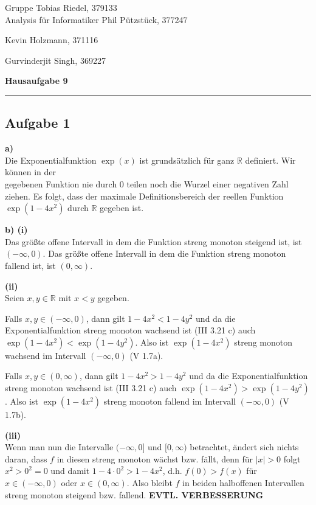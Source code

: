 \documentclass[a4paper,graphics,11pt]{article}
\newcommand{\aufgabe}[1]{\subsection*{Aufgabe #1}}
\begin{document}
\noindent Gruppe              \hfill Tobias Riedel, 379133 \\
\noindent Analysis für Informatiker             \hfill Phil Pützstück, 377247 \\
\strut\hfill Kevin Holzmann, 371116\\
\strut\hfill Gurvinderjit Singh, 369227
\begin{center}
	\LARGE{\textbf{Hausaufgabe 9}}
\end{center}
\begin{center}
\rule[0.1ex]{\textwidth}{1pt}
\end{center}



\aufgabe{1}
\textbf{a)}\\
Die Exponentialfunktion $\exp(x)$ ist grundsätzlich für ganz $\mathbb{R}$ definiert.
Wir können in der\\
gegebenen Funktion nie durch 0 teilen noch die Wurzel einer
negativen Zahl ziehen. Es folgt, dass der maximale Definitionsbereich der
reellen Funktion $\exp(1-4x^2)$ durch $\mathbb{R}$ gegeben ist.

\textbf{b) (i)}\\
Das größte offene Intervall in dem die Funktion streng monoton steigend ist, ist
$(-\infty, 0)$. Das größte offene Intervall in dem die Funktion streng monoton
fallend ist, ist $(0, \infty)$.

\textbf{(ii)}\\
Seien $x,y \in \mathbb{R}$ mit $x<y$ gegeben.

Falls $x,y \in (-\infty, 0)$, dann gilt $1-4x^2 < 1-4y^2$ und da die Exponentialfunktion
streng monoton wachsend ist (III 3.21 c) auch $\exp(1-4x^2) < \exp(1-4y^2)$.
Also ist $\exp(1-4x^2)$ streng monoton wachsend im Intervall $(-\infty, 0)$ (V 1.7a).

Falls $x,y \in (0, \infty)$, dann gilt $1-4x^2 > 1-4y^2$ und da die Exponentialfunktion
streng monoton wachsend ist (III 3.21 c) auch $\exp(1-4x^2) > \exp(1-4y^2)$.
Also ist $\exp(1-4x^2)$ streng monoton fallend im Intervall $(-\infty, 0)$ (V 1.7b).

\textbf{(iii)}\\
Wenn man nun die Intervalle $(-\infty, 0]$ und $[0, \infty)$ betrachtet, ändert sich
nichts daran, dass $f$ in diesen streng monoton wächst bzw. fällt, denn für
$|x| > 0$ folgt $x^2 > 0^2 = 0$ und damit $1-4\cdot0^2 > 1-4x^2$, d.h.
$f(0) > f(x)$ für $x \in (-\infty, 0)$ oder $x \in (0, \infty)$. Also
bleibt $f$ in beiden halboffenen Intervallen streng monoton steigend bzw. fallend.
\textbf{EVTL. VERBESSERUNG}
\end{document}
